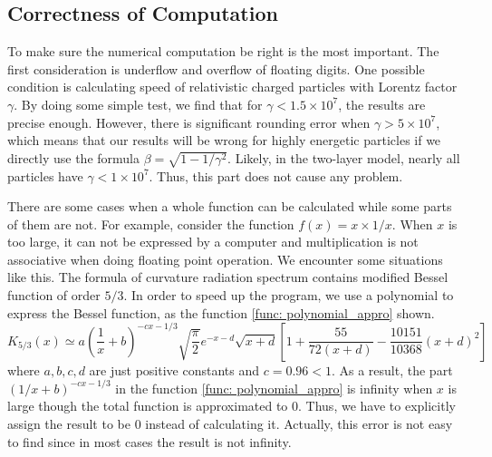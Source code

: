 \documentclass[12pt]{report}
\begin{document}
        \subsection{Correctness of Computation}
          To make sure the numerical computation be right is the most important. 
          The first consideration is underflow and overflow of floating digits.
          One possible condition is calculating speed of relativistic charged particles with 
          Lorentz factor $\gamma$. By doing some simple test, we find that for 
          $\gamma < 1.5\times 10^7$, the results are precise enough. However, there is significant rounding error
          when $\gamma > 5\times 10^7$, which means that our results will be wrong for highly 
          energetic particles if we directly use the formula $\beta = \sqrt{1 - 1/\gamma^2}$.
          Likely, in the two-layer model, nearly all particles have $\gamma < 1\times 10^7$. 
          Thus, this part does not cause any problem.
            
          There are some cases when a whole function can be calculated while some parts of them are not. 
          For example, consider the function $f\left(x\right) = x\times1/x$. When $x$ is too large, it 
          can not be expressed by a computer and multiplication is not associative when doing floating 
          point operation. We encounter some situations like this.
          The formula of curvature radiation spectrum contains modified Bessel function of order $5/3$.
          In order to speed up the program, we use a polynomial to express the Bessel function, as the 
          function \ref{func: polynomial_appro} shown. 
          \begin{equation}
            K_{5/3} \left(x\right) \simeq a \left(\frac{1}{x} + b\right)^{-cx - 1/3} \sqrt{\frac{\pi}{2}} e^{-x - d} \sqrt{x + d} %
            \left[1 + \frac{55}{72\left(x + d\right)} - \frac{10151}{10368}\left(x+d\right)^2\right] 
            \label{func: polynomial_appro}
          \end{equation}
          where $a,b,c,d$ are just positive constants and $c = 0.96 < 1$. As a result, 
          the part $(1/x + b)^{-cx - 1/3}$ in the function \ref{func: polynomial_appro} is infinity
          when $x$ is large though the total function is approximated to $0$. Thus, we have to explicitly 
          assign the result to be $0$ instead of calculating it. Actually, this error is not easy to find 
          since in most cases the result is not infinity. 
          
\end{document}
